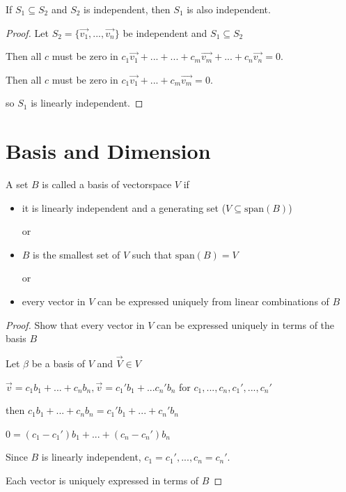 \documentclass[11pt]{article}
\begin{document}
\begin{theorem}
If \(S_1 \subseteq S_2\) and \(S_2\) is independent, then \(S_1\) is also independent.
\end{theorem}
\begin{proof}
Let \(S_2 = \{\overrightarrow{v_1}, ...,\overrightarrow{v_n}\}\) be independent and \(S_1 \subseteq S_2\)

Then all \(c\) must be zero in \(c_1 \overrightarrow{v_1} + ... + ... + c_m \overrightarrow{v_m} + ... + c_n \overrightarrow{v_n} = 0\).

Then all \(c\) must be zero in \(c_1 \overrightarrow{v_1} + ... + c_m \overrightarrow{v_m} = 0\).

so \(S_1\) is linearly independent.
\end{proof}

\section{Basis and Dimension}
\label{sec:orgheadline6}
\begin{definition}
A set \(B\) is called a basis of vectorspace \(V\) if

\begin{itemize}
\item it is linearly independent and a generating set (\(V \subseteq \text{span} (B)\))

or

\item \(B\) is the smallest set of \(V\) such that \(\text{span} (B) = V\)

or

\item every vector in \(V\) can be expressed uniquely from linear combinations of \(B\)
\end{itemize}
\end{definition}
\begin{proof}
Show that every vector in \(V\) can be expressed uniquely in terms of the basis \(B\)

Let \(\beta\) be a basis of \(V\) and \(\overrightarrow{V} \in V\)

\(\overrightarrow{v} = c_1 b_1 + ... + c_n b_n, \overrightarrow{v} = c_1' b_1 + ... c_n' b_n\) for \(c_1, ..., c_n, c_1', ..., c_n'\)

then  \(c_1 b_1 + ... + c_n b_n = c_1' b_1 + ... + c_n' b_n\)

\(0 = (c_1 - c_1')b_1 + ... + (c_n - c_n')b_n\)

Since \(B\) is linearly independent, \(c_1 = c_1', ..., c_n = c_n'\).

Each vector is uniquely expressed in terms of \(B\)
\end{proof}
\end{document}
